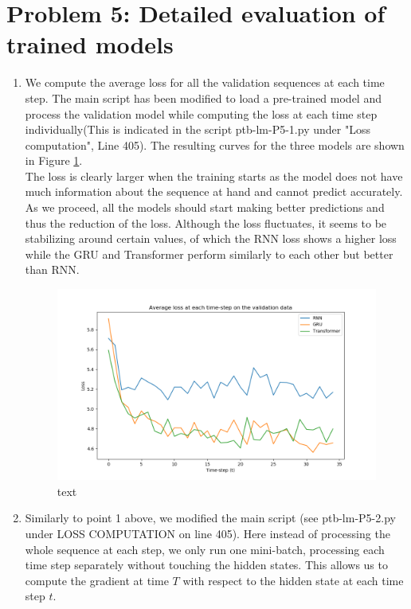 \section{Problem 5: Detailed evaluation of trained models}
\begin{enumerate}
	\item
We compute the average loss for all the validation sequences at each time step. The main script has been modified to load a pre-trained model and process the validation model while computing the loss at each time step individually(This is indicated in the script ptb-lm-P5-1.py under "Loss computation", Line 405). The resulting curves for the three models are shown in Figure \ref{fig:5_1}. \\
The loss is clearly larger when the training starts as the model does not have much information about the sequence at hand and cannot predict accurately. As we proceed, all the models should start making better predictions and thus the reduction of the loss. Although the loss fluctuates, it seems to be stabilizing around certain values, of which the RNN loss shows a higher loss while the GRU and Transformer perform similarly to each other but better than RNN. 
\begin{figure}
	\centering
	\includegraphics[width=15cm]{loss_t-step}
	\caption{text}
	\label{fig:5_1}
\end{figure}
\item
Similarly to point 1 above, we modified the main script (see ptb-lm-P5-2.py under LOSS COMPUTATION on line 405). Here instead of processing the whole sequence at each step, we only run one mini-batch, processing each time step separately without touching the hidden states. This allows us to compute the gradient at time $T$ with respect to the hidden state at each time step $t$. \\

\end{enumerate}
